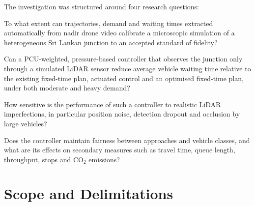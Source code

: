 The investigation was structured around four research questions:
\begin{description}[leftmargin=1.2cm, style=nextline, itemsep=3pt]
  \item[RQ1] To what extent can trajectories, demand and waiting times extracted automatically from nadir drone video calibrate a microscopic simulation of a heterogeneous Sri Lankan junction to an accepted standard of fidelity?
  \item[RQ2] Can a PCU-weighted, pressure-based controller that observes the junction only through a simulated LiDAR sensor reduce average vehicle waiting time relative to the existing fixed-time plan, actuated control and an optimised fixed-time plan, under both moderate and heavy demand?
  \item[RQ3] How sensitive is the performance of such a controller to realistic LiDAR imperfections, in particular position noise, detection dropout and occlusion by large vehicles?
  \item[RQ4] Does the controller maintain fairness between approaches and vehicle classes, and what are its effects on secondary measures such as travel time, queue length, throughput, stops and CO$_2$ emissions?
\end{description}

\section{Scope and Delimitations}\label{sec:intro-scope}

